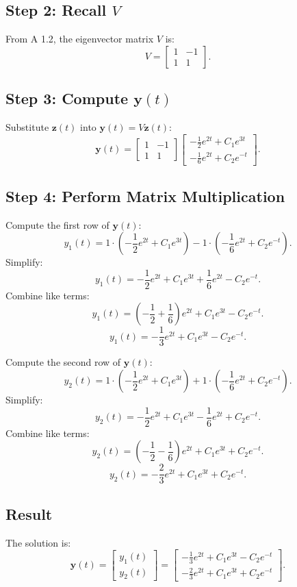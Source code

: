 \documentclass[12pt]{article}
\begin{document}
\subsection*{Step 2: Recall \(V\)}
From A 1.2, the eigenvector matrix \(V\) is:
\[
V = \begin{bmatrix} 1 & -1 \\ 1 & 1 \end{bmatrix}.
\]

\subsection*{Step 3: Compute \(\mathbf{y}(t)\)}
Substitute \(\mathbf{z}(t)\) into \(\mathbf{y}(t) = V\mathbf{z}(t)\):
\[
\mathbf{y}(t) = \begin{bmatrix} 1 & -1 \\ 1 & 1 \end{bmatrix} \begin{bmatrix} -\frac{1}{2}e^{2t} + C_1e^{3t} \\ -\frac{1}{6}e^{2t} + C_2e^{-t} \end{bmatrix}.
\]

\subsection*{Step 4: Perform Matrix Multiplication}
Compute the first row of \(\mathbf{y}(t)\):
\[
y_1(t) = 1\cdot\left(-\frac{1}{2}e^{2t} + C_1e^{3t}\right) - 1\cdot\left(-\frac{1}{6}e^{2t} + C_2e^{-t}\right).
\]
Simplify:
\[
y_1(t) = -\frac{1}{2}e^{2t} + C_1e^{3t} + \frac{1}{6}e^{2t} - C_2e^{-t}.
\]
Combine like terms:
\[
y_1(t) = \left(-\frac{1}{2} + \frac{1}{6}\right)e^{2t} + C_1e^{3t} - C_2e^{-t}.
\]
\[
y_1(t) = -\frac{1}{3}e^{2t} + C_1e^{3t} - C_2e^{-t}.
\]

Compute the second row of \(\mathbf{y}(t)\):
\[
y_2(t) = 1\cdot\left(-\frac{1}{2}e^{2t} + C_1e^{3t}\right) + 1\cdot\left(-\frac{1}{6}e^{2t} + C_2e^{-t}\right).
\]
Simplify:
\[
y_2(t) = -\frac{1}{2}e^{2t} + C_1e^{3t} -\frac{1}{6}e^{2t} + C_2e^{-t}.
\]
Combine like terms:
\[
y_2(t) = \left(-\frac{1}{2} - \frac{1}{6}\right)e^{2t} + C_1e^{3t} + C_2e^{-t}.
\]
\[
y_2(t) = -\frac{2}{3}e^{2t} + C_1e^{3t} + C_2e^{-t}.
\]

\subsection*{Result}
The solution is:
\[
\mathbf{y}(t) = \begin{bmatrix} y_1(t) \\ y_2(t) \end{bmatrix} = \begin{bmatrix} -\frac{1}{3}e^{2t} + C_1e^{3t} - C_2e^{-t} \\ -\frac{2}{3}e^{2t} + C_1e^{3t} + C_2e^{-t} \end{bmatrix}.
\]
\end{document}
